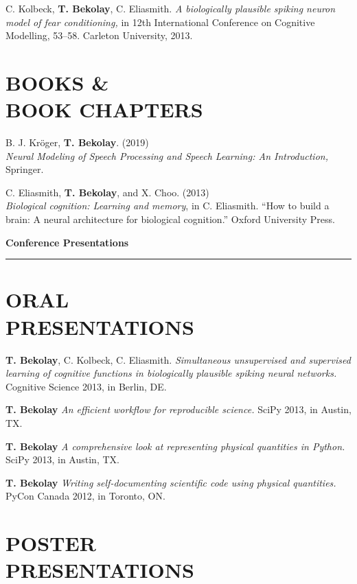 \documentclass[line,margin]{res}
\begin{document}
\begin{resume}
C. Kolbeck, \textbf{T. Bekolay}, C. Eliasmith. {\sl A biologically
  plausible spiking neuron model of fear conditioning,} in 12th International
  Conference on Cognitive Modelling, 53--58.
  Carleton University, 2013.

\section{BOOKS \& \\BOOK CHAPTERS}

B. J. Kr\"{o}ger, \textbf{T. Bekolay}. (2019) \\
  {\sl Neural Modeling of Speech Processing
  and Speech Learning: An Introduction,}
  Springer.

C. Eliasmith, \textbf{T. Bekolay}, and X. Choo. (2013) \\
  {\sl Biological cognition: Learning and memory}, in C. Eliasmith.
  ``How to build a brain: A neural architecture for biological cognition.''
  Oxford University Press. \vspace{0.42em}

{\Large \bf Conference Presentations} \\ \vspace{-8pt} \hrule

\section{ORAL \\PRESENTATIONS}

\textbf{T. Bekolay}, C. Kolbeck, C. Eliasmith.
  {\sl Simultaneous unsupervised and supervised learning of cognitive
  functions in biologically plausible spiking neural networks.} \\
  Cognitive Science 2013, in Berlin, DE.

\textbf{T. Bekolay} {\sl An efficient workflow for reproducible science.}
  SciPy 2013, in Austin, TX.

\textbf{T. Bekolay}
  {\sl A comprehensive look at representing physical quantities in Python.}
  SciPy 2013, in Austin, TX.

\textbf{T. Bekolay}
  {\sl Writing self-documenting scientific code using physical quantities.}
  PyCon Canada 2012, in Toronto, ON.

\section{POSTER \\PRESENTATIONS}


\end{resume}
\end{document}
